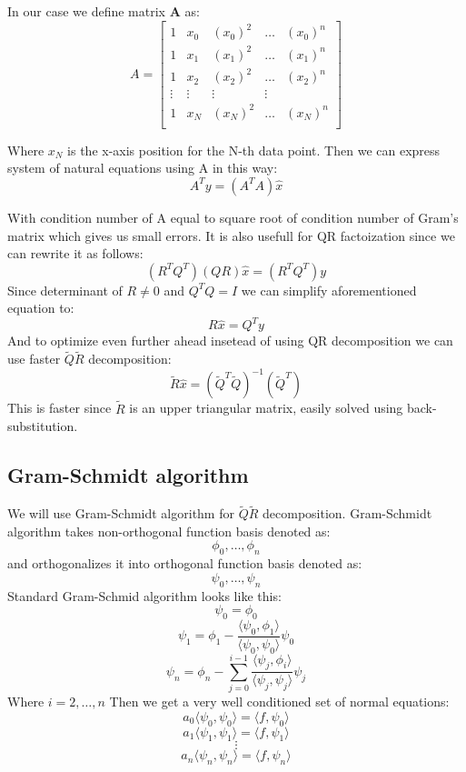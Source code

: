 In our case we define matrix \textbf{A} as:
\[
A = \begin{bmatrix}
1 & x_0 & (x_0)^2  & \dots & (x_0)^n \\
1 & x_1 & (x_1)^2 &  \dots & (x_1)^n\\
1 & x_2 & (x_2)^2 &  \dots & (x_2)^n\\
\vdots & \vdots & \vdots & \vdots \\
1 & x_N & (x_N)^2 &  \dots & (x_N)^n\\
\end{bmatrix}
\]

Where $x_N$ is the x-axis position for the N-th data point. Then we can express system of natural equations using A in this way:
\[ A^Ty = (A^TA)\hat{x} \]

With condition number of A equal to square root of condition number of Gram's matrix which gives us small errors. It is also usefull for QR factoization since we can rewrite it as follows:
\[ (R^TQ^T)(QR)\hat{x} = (R^TQ^T)y \]
Since determinant of $R \neq 0$ and $Q^TQ = I$ we can simplify aforementioned equation to:
\[ R\hat{x} = Q^Ty \]
And to optimize even further ahead insetead of using QR decomposition we can use faster $\tilde{Q}\tilde{R}$ decomposition:
\[ \tilde{R}\hat{x} = (\tilde{Q}^T\tilde{Q})^{-1}(\tilde{Q}^T) \]
This is faster since $\tilde{R}$ is an upper triangular matrix, easily solved using back-substitution.

\subsection{Gram-Schmidt algorithm}
We will use Gram-Schmidt algorithm for $\tilde{Q}\tilde{R}$ decomposition.
Gram-Schmidt algorithm takes non-orthogonal function basis denoted as:
\[ \phi_0, \dots, \phi_n \]
and orthogonalizes it into orthogonal function basis denoted as:
\[ \psi_0, \dots, \psi_n \]
Standard Gram-Schmid algorithm looks like this:
\[ \psi_0 = \phi_0 \]
\[ \psi_1 = \phi_1 - \frac{\langle \psi_0, \phi_1 \rangle}{\langle \psi_0, \psi_0 \rangle} \psi_0 \]
\[ \psi_n = \phi_n - \sum_{j = 0}^{i-1}  \frac{\langle \psi_j, \phi_i \rangle}{\langle \psi_j, \psi_j \rangle} \psi_j \]
Where $ i = 2, \dots, n $
Then we get a very well conditioned set of normal equations:
\[ a_0\langle \psi_0, \psi_0 \rangle = \langle f, \psi_0 \rangle \]
\[ a_1\langle \psi_1, \psi_1 \rangle = \langle f, \psi_1 \rangle \]
\[ \vdots \]
\[ a_n\langle \psi_n, \psi_n \rangle = \langle f, \psi_n \rangle \]

